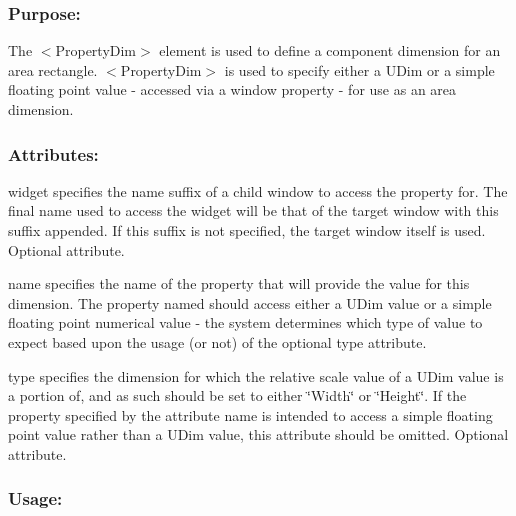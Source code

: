 \hypertarget{fal_element_ref_fal_elem_ref_sec_28_1}{}\subsubsection{Purpose\+:}\label{fal_element_ref_fal_elem_ref_sec_28_1}
The {\ttfamily $<$Property\+Dim$>$} element is used to define a component dimension for an area rectangle. {\ttfamily $<$Property\+Dim$>$} is used to specify either a U\+Dim or a simple floating point value -\/ accessed via a window property -\/ for use as an area dimension.\hypertarget{fal_element_ref_fal_elem_ref_sec_28_2}{}\subsubsection{Attributes\+:}\label{fal_element_ref_fal_elem_ref_sec_28_2}
\begin{DoxyItemize}
\item {\ttfamily widget} specifies the name suffix of a child window to access the property for. The final name used to access the widget will be that of the target window with this suffix appended. If this suffix is not specified, the target window itself is used. Optional attribute. \item {\ttfamily name} specifies the name of the property that will provide the value for this dimension. The property named should access either a U\+Dim value or a simple floating point numerical value -\/ the system determines which type of value to expect based upon the usage (or not) of the optional {\ttfamily type} attribute. \item {\ttfamily type} specifies the dimension for which the relative scale value of a U\+Dim value is a portion of, and as such should be set to either {\ttfamily \char`\"{}\+Width\char`\"{}} or {\ttfamily \char`\"{}\+Height\char`\"{}}. If the property specified by the attribute {\ttfamily name} is intended to access a simple floating point value rather than a U\+Dim value, this attribute should be omitted. Optional attribute.\end{DoxyItemize}
\hypertarget{fal_element_ref_fal_elem_ref_sec_28_3}{}\subsubsection{Usage\+:}\label{fal_element_ref_fal_elem_ref_sec_28_3}

